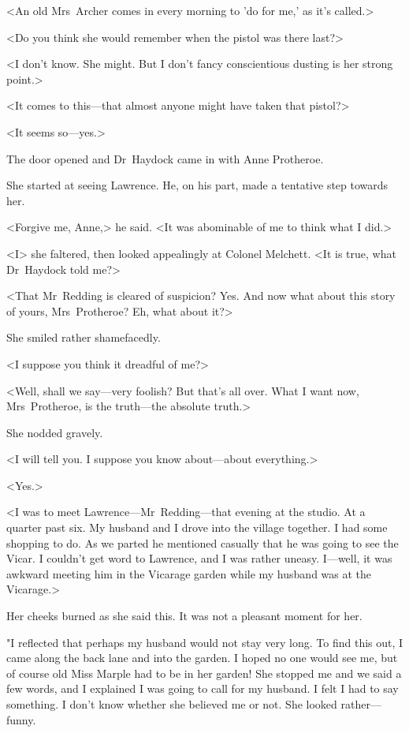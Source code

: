 <An old Mrs~Archer comes in every morning to 'do for me,' as it's called.>

<Do you think she would remember when the pistol was there last?>

<I don't know. She might. But I don't fancy conscientious dusting is her strong point.>

<It comes to this—that almost anyone might have taken that pistol?>

<It seems so—yes.>

The door opened and Dr~Haydock came in with Anne Protheroe.

She started at seeing Lawrence. He, on his part, made a tentative step towards her.

<Forgive me, Anne,> he said. <It was abominable of me to think what I did.>

<I\longdash> she faltered, then looked appealingly at Colonel Melchett. <It is true, what Dr~Haydock told me?>

<That Mr~Redding is cleared of suspicion? Yes. And now what about this story of yours, Mrs~Protheroe? Eh, what about it?>

She smiled rather shamefacedly.

<I suppose you think it dreadful of me?>

<Well, shall we say—very foolish? But that's all over. What I want now, Mrs~Protheroe, is the truth—the absolute truth.>

She nodded gravely.

<I will tell you. I suppose you know about—about everything.>

<Yes.>

<I was to meet Lawrence—Mr~Redding—that evening at the studio. At a quarter past six. My husband and I drove into the village together. I had some shopping to do. As we parted he mentioned casually that he was going to see the Vicar. I couldn't get word to Lawrence, and I was rather uneasy. I—well, it was awkward meeting him in the Vicarage garden while my husband was at the Vicarage.>

Her cheeks burned as she said this. It was not a pleasant moment for her.

"I reflected that perhaps my husband would not stay very long. To find this out, I came along the back lane and into the garden. I hoped no one would see me, but of course old Miss Marple had to be in her garden! She stopped me and we said a few words, and I explained I was going to call for my husband. I felt I had to say something. I don't know whether she believed me or not. She looked rather—funny.

